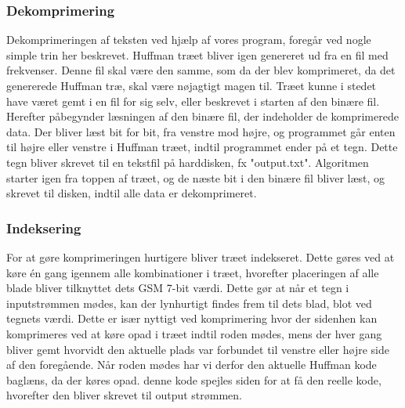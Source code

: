 \subsubsection{Dekomprimering}

Dekomprimeringen af teksten ved hjælp af vores program, foregår ved nogle simple trin her beskrevet. Huffman træet bliver igen genereret ud fra en fil med frekvenser. Denne fil skal være den samme, som da der blev komprimeret, da det genererede Huffman træ, skal være nøjagtigt magen til. Træet kunne i stedet have været gemt i en fil for sig selv, eller beskrevet i starten af den binære fil.
Herefter påbegynder læsningen af den binære fil, der indeholder de komprimerede data. Der bliver læst bit for bit, fra venstre mod højre, og programmet går enten til højre eller venstre i Huffman træet, indtil programmet ender på et tegn. Dette tegn bliver skrevet til en tekstfil på harddisken, fx "output.txt". Algoritmen starter igen fra toppen af træet, og de næste bit i den binære fil bliver læst, og skrevet til disken, indtil alle data er dekomprimeret.

\subsubsection{Indeksering}
For at gøre komprimeringen hurtigere bliver træet indekseret. Dette gøres ved at køre én gang igennem alle kombinationer i træet, hvorefter placeringen af alle blade bliver tilknyttet dets GSM 7-bit værdi. Dette gør at når et tegn i inputstrømmen mødes, kan der lynhurtigt findes frem til dets blad, blot ved tegnets værdi. Dette er især nyttigt ved komprimering hvor der sidenhen kan komprimeres ved at køre opad i træet indtil roden mødes, mens der hver gang bliver gemt hvorvidt den aktuelle plads var forbundet til venstre eller højre side af den foregående. Når roden mødes har vi derfor den aktuelle Huffman kode baglæns, da der køres opad. denne kode spejles siden for at få den reelle kode, hvorefter den bliver skrevet til output strømmen.
